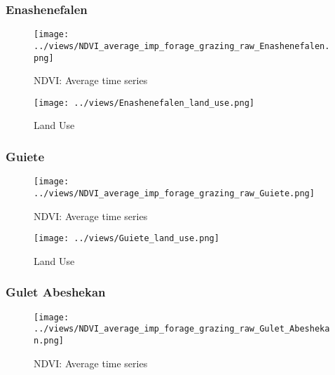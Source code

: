 \documentclass[10pt,a4paper,onecolumn]{article}
\begin{document}

\pagebreak


\subsubsection{Enashenefalen}
\begin{figure}[H] \centering
  \captionsetup{justification=centering}
\caption{NDVI: Average time series } 
\centering


\texttt{[image: ../views/NDVI\_average\_imp\_forage\_grazing\_raw\_Enashenefalen.png]}

\end{figure}

\begin{figure}[H] \centering
  \captionsetup{justification=centering}
\caption{Land Use} 
\centering


\texttt{[image: ../views/Enashenefalen\_land\_use.png]}

\end{figure}



\pagebreak


\subsubsection{Guiete}
\begin{figure}[H] \centering
  \captionsetup{justification=centering}
\caption{NDVI: Average time series } 
\centering


\texttt{[image: ../views/NDVI\_average\_imp\_forage\_grazing\_raw\_Guiete.png]}

\end{figure}


\begin{figure}[H] \centering
  \captionsetup{justification=centering}
\caption{Land Use} 
\centering


\texttt{[image: ../views/Guiete\_land\_use.png]}

\end{figure}


\pagebreak


\subsubsection{Gulet Abeshekan}
\begin{figure}[H] \centering
  \captionsetup{justification=centering}
\caption{NDVI: Average time series } 
\centering


\texttt{[image: ../views/NDVI\_average\_imp\_forage\_grazing\_raw\_Gulet\_Abeshekan.png]}

\end{figure}
\end{document}

